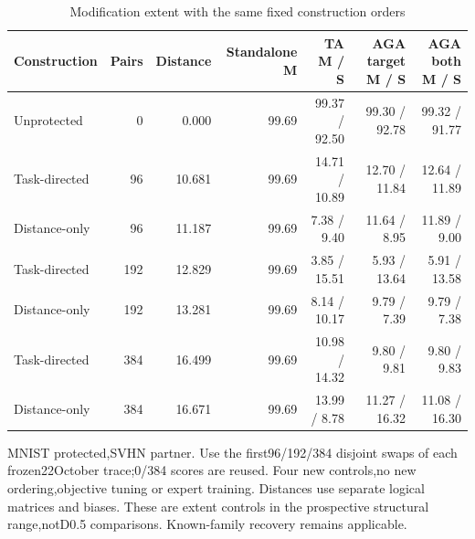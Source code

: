 \begin{table}[!htbp]
\centering
\small
\caption{Modification extent with the same fixed construction orders}
\label{tab:amplitude}
\begin{tabular}{lrrrrrr}
\toprule
Construction & Pairs & Distance & Standalone M & TA M / S & AGA target M / S & AGA both M / S \\
\midrule
Unprotected & 0 & 0.000 & 99.69 & 99.37 / 92.50 & 99.30 / 92.78 & 99.32 / 91.77 \\
Task-directed & 96 & 10.681 & 99.69 & 14.71 / 10.89 & 12.70 / 11.84 & 12.64 / 11.89 \\
Distance-only & 96 & 11.187 & 99.69 & 7.38 / 9.40 & 11.64 / 8.95 & 11.89 / 9.00 \\
Task-directed & 192 & 12.829 & 99.69 & 3.85 / 15.51 & 5.93 / 13.64 & 5.91 / 13.58 \\
Distance-only & 192 & 13.281 & 99.69 & 8.14 / 10.17 & 9.79 / 7.39 & 9.79 / 7.38 \\
Task-directed & 384 & 16.499 & 99.69 & 10.98 / 14.32 & 9.80 / 9.81 & 9.80 / 9.83 \\
Distance-only & 384 & 16.671 & 99.69 & 13.99 / 8.78 & 11.27 / 16.32 & 11.08 / 16.30 \\
\bottomrule
\end{tabular}
\par\vspace{3pt}\begin{minipage}{0.98\linewidth}\footnotesize MNIST protected,SVHN partner. Use the first96/192/384 disjoint swaps of each frozen22October trace;0/384 scores are reused. Four new controls,no new ordering,objective tuning or expert training. Distances use separate logical matrices and biases. These are extent controls in the prospective structural range,notD0.5 comparisons. Known-family recovery remains applicable.\end{minipage}
\end{table}

